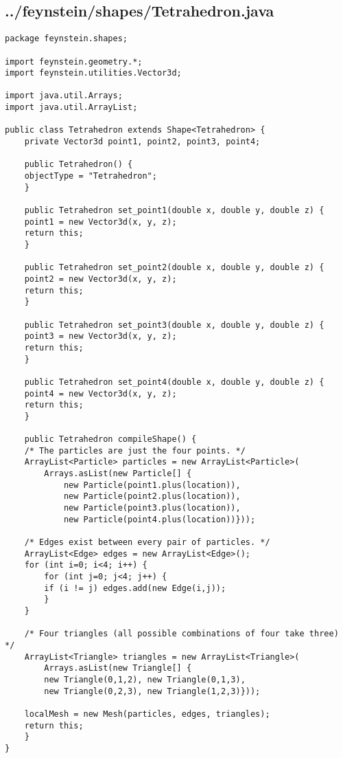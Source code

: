 \subsection*{../feynstein/shapes/Tetrahedron.java}
\begin{lstlisting}
package feynstein.shapes;

import feynstein.geometry.*;
import feynstein.utilities.Vector3d;

import java.util.Arrays;
import java.util.ArrayList;

public class Tetrahedron extends Shape<Tetrahedron> {
    private Vector3d point1, point2, point3, point4;

    public Tetrahedron() {
	objectType = "Tetrahedron";
    }

    public Tetrahedron set_point1(double x, double y, double z) {
	point1 = new Vector3d(x, y, z);
	return this;
    }

    public Tetrahedron set_point2(double x, double y, double z) {
	point2 = new Vector3d(x, y, z);
	return this;
    }

    public Tetrahedron set_point3(double x, double y, double z) {
	point3 = new Vector3d(x, y, z);
	return this;
    }

    public Tetrahedron set_point4(double x, double y, double z) {
	point4 = new Vector3d(x, y, z);
	return this;
    }

    public Tetrahedron compileShape() {
	/* The particles are just the four points. */
	ArrayList<Particle> particles = new ArrayList<Particle>(
	    Arrays.asList(new Particle[] {
		    new Particle(point1.plus(location)), 
		    new Particle(point2.plus(location)), 
		    new Particle(point3.plus(location)), 
		    new Particle(point4.plus(location))}));

	/* Edges exist between every pair of particles. */
	ArrayList<Edge> edges = new ArrayList<Edge>();
	for (int i=0; i<4; i++) {
	    for (int j=0; j<4; j++) {
		if (i != j) edges.add(new Edge(i,j));
	    }
	}

	/* Four triangles (all possible combinations of four take three) */
	ArrayList<Triangle> triangles = new ArrayList<Triangle>(
	    Arrays.asList(new Triangle[] {
		new Triangle(0,1,2), new Triangle(0,1,3),
		new Triangle(0,2,3), new Triangle(1,2,3)}));

	localMesh = new Mesh(particles, edges, triangles);
	return this;
    }
}\end{lstlisting}

